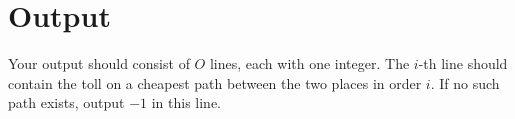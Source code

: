 

\section*{Output}
Your output should consist of $O$ lines, each with one integer. The $i$-th line should contain the toll on a cheapest path between the two places in order $i$. If no such path exists, output $-1$ in this line.
